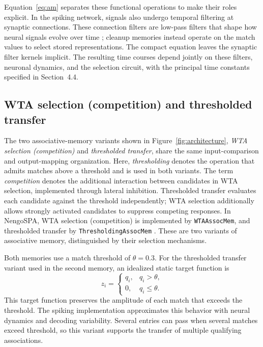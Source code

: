 Equation~\eqref{eq:am} separates these functional operations to make their roles explicit. In the spiking network, signals also undergo temporal filtering at synaptic connections. These connection filters are low-pass filters that shape how neural signals evolve over time \citep{eliasmith2003}; cleanup memories instead operate on the match values to select stored representations. The compact equation leaves the synaptic filter kernels implicit. The resulting time courses depend jointly on these filters, neuronal dynamics, and the selection circuit, with the principal time constants specified in Section~4.4.

\subsection{WTA selection (competition) and thresholded transfer}
The two associative-memory variants shown in Figure~\ref{fig:architecture}, \emph{WTA selection (competition)} and \emph{thresholded transfer}, share the same input-comparison and output-mapping organization. Here, \emph{thresholding} denotes the operation that admits matches above a threshold and is used in both variants. The term \emph{competition} denotes the additional interaction between candidates in WTA selection, implemented through lateral inhibition. Thresholded transfer evaluates each candidate against the threshold independently; WTA selection additionally allows strongly activated candidates to suppress competing responses. In NengoSPA, WTA selection (competition) is implemented by \texttt{WTAAssocMem}, and thresholded transfer by \texttt{ThresholdingAssocMem} \citep{nengospaAM}. These are two variants of associative memory, distinguished by their selection mechanisms.

Both memories use a match threshold of $\theta=0.3$. For the thresholded transfer variant used in the second memory, an idealized static target function is
\begin{equation}
 z_i=\begin{cases}q_i,&q_i>\theta,\\0,&q_i\leq\theta.\end{cases}
 \label{eq:threshold}
\end{equation}
This target function preserves the amplitude of each match that exceeds the threshold. The spiking implementation approximates this behavior with neural dynamics and decoding variability. Several entries can pass when several matches exceed threshold, so this variant supports the transfer of multiple qualifying associations.

